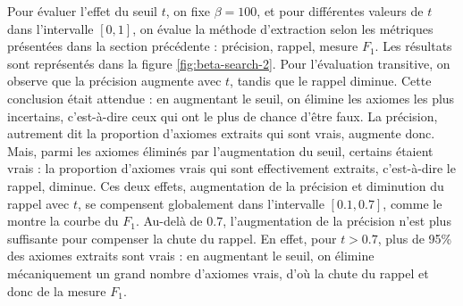 Pour évaluer l'effet du seuil $t$, on fixe $\beta = 100$, et pour différentes valeurs de $t$ dans l'intervalle $[0, 1]$, on évalue la méthode d'extraction selon les métriques présentées dans la section précédente : précision, rappel, mesure $F_1$. Les résultats sont représentés dans la figure \ref{fig:beta-search-2}. Pour l'évaluation transitive, on observe que la précision augmente avec $t$, tandis que le rappel diminue. Cette conclusion était attendue : en augmentant le seuil, on élimine les axiomes les plus incertains, c'est-à-dire ceux qui ont le plus de chance d'être faux. La précision, autrement dit la proportion d'axiomes extraits qui sont vrais, augmente donc. Mais, parmi les axiomes éliminés par l'augmentation du seuil, certains étaient vrais : la proportion d'axiomes vrais qui sont effectivement extraits, c'est-à-dire le rappel, diminue. Ces deux effets, augmentation de la précision et diminution du rappel avec $t$, se compensent globalement dans l'intervalle $[0.1, 0.7]$, comme le montre la courbe du $F_1$. Au-delà de $0.7$, l'augmentation de la précision n'est plus suffisante pour compenser la chute du rappel. En effet, pour $t > 0.7$, plus de 95\% des axiomes extraits sont vrais : en augmentant le seuil, on élimine mécaniquement un grand nombre d'axiomes vrais, d'où la chute du rappel et donc de la mesure $F_1$.

